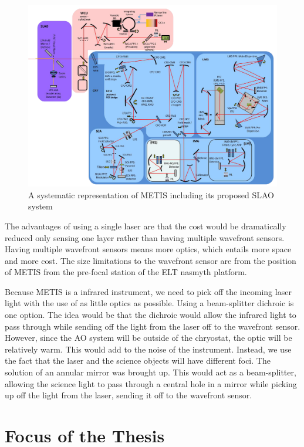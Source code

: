 \begin{figure}[h!]
\centering
\includegraphics[width=12 cm]{Figures/METIS_SLAO.png}
\caption{A systematic representation of METIS including its proposed SLAO system \cite{METISSPIE2016}}
\label{fig:metis_over}
\end{figure}

The advantages of using a single laser are that the cost would be dramatically
reduced only sensing one layer rather than having multiple wavefront sensors. 
Having multiple wavefront sensors means more optics, which entails more space and
more cost.  The size limitations to the wavefront sensor are from the position of
METIS from the pre-focal station of the ELT nasmyth platform.

Because METIS is a infrared instrument, we need to pick off the incoming laser light
with the use of as little optics as possible.  Using a beam-splitter dichroic is one
option.  The idea would be that the dichroic would allow the infrared light to pass
through while sending off the light from the laser off to the wavefront sensor. 
However, since the AO system will be outside of the chryostat, the optic will be
relatively warm.  This would add to the noise of the instrument.  Instead, we use
the fact that the laser and the science objects will have different foci.  The
solution of an annular mirror was brought up.  This would act as a beam-splitter,
allowing the science light to pass through a central hole in a mirror while picking
up off the light from the laser, sending it off to the wavefront sensor.

\section{Focus of the Thesis}

